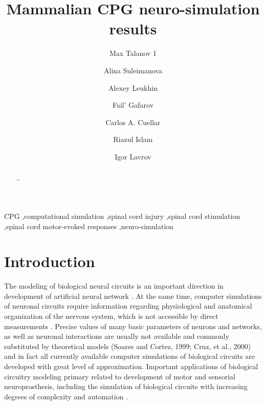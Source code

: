 \documentclass[]{elsarticle}
\title{Mammalian CPG neuro-simulation results}
\begin{document}
\begin{frontmatter}

\author[inst1]{Max Talanov 1}
\author[inst1]{Alina Suleimanova}
\author[inst1]{Alexey Leukhin}
\author[inst1]{Fail' Gafarov}
\author[inst2]{Carlos A. Cuellar}
\author[inst2]{Riazul Islam}
\author[inst1,inst2,inst3,inst4,*]{Igor Lavrov}

\address[inst1]{Kazan Federal University, Kazan Russia.}
\address[inst2]{Department of Neurologic Surgery, Mayo Clinic, Rochester, MN, USA.}
\address[inst3]{Department of Physiology and Biomedical Engineering, Mayo Clinic, Rochester, MN, USA}
\address[inst4]{Department of Neurology, Mayo Clinic, Rochester, MN, USA}
\address[*]{Corresponding author}

\begin{abstract}

\ldots

\end{abstract}

\begin{keyword}
CPG \sep computational simulation \sep spinal cord injury \sep spinal cord stimulation \sep spinal cord motor-evoked responses \sep neuro-simulation
\end{keyword}
\end{frontmatter}


\section{Introduction}

The modeling of biological neural circuits is an important direction in development  of artificial neural network \cite{bekka2002use}.  
At the same time, computer simulations of neuronal circuits require information regarding physiological and anatomical organization of the nervous system, which is not accessible by direct measurements \cite{prentice2001artificial}. Precise values of many basic parameters of neurons and networks, as well as neuronal interactions are usually not available and commonly substituted by theoretical models (Soares and Cortez, 1999; Cruz, et al., 2000) \cite{bizzi1991computations} and in fact all currently available computer simulations of biological circuits are developed with great level of approximation. Important applications of biological circuitry modeling primary related to development of motor and sensorial neuroprosthesis, including the simulation of biological circuits with increasing degrees of complexity and automation \cite{donaldson1997neuroprostheses,lauer1999eeg}. 
\end{document}
